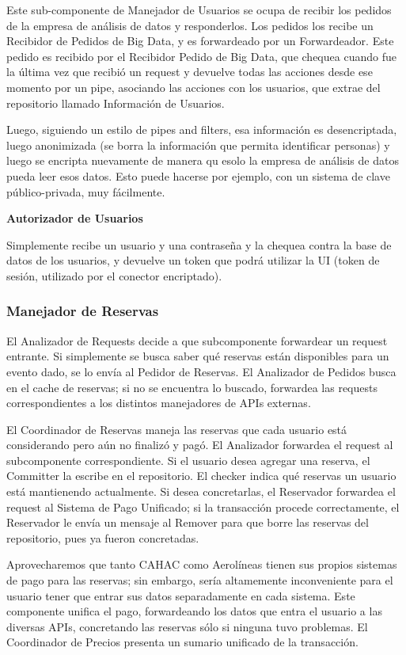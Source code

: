 Este sub-componente de Manejador de Usuarios se ocupa de recibir los pedidos de la empresa de análisis de datos y responderlos. Los pedidos los recibe un Recibidor de Pedidos de Big Data, y es forwardeado por un Forwardeador. Este pedido es recibido por el Recibidor Pedido de Big Data, que chequea cuando fue la última vez que recibió un request y devuelve todas las acciones desde ese momento por un pipe, asociando las acciones con los usuarios, que extrae del repositorio
llamado Información de Usuarios.

Luego, siguiendo un estilo de pipes and filters, esa información es desencriptada, luego anonimizada (se borra la información que permita identificar personas) y luego se encripta nuevamente de manera qu esolo la empresa de análisis de datos pueda leer esos datos. Esto puede hacerse por ejemplo, con un sistema de clave público-privada, muy fácilmente.

\textbf{Autorizador de Usuarios}

Simplemente recibe un usuario y una contraseña y la chequea contra la base de datos de los usuarios, y devuelve un token que podrá utilizar la UI (token de sesión, utilizado por el conector encriptado).

\subsubsection{Manejador de Reservas}

El Analizador de Requests decide a que subcomponente forwardear un request entrante. Si simplemente se busca saber qué reservas están disponibles para un evento dado, se lo envía al Pedidor de Reservas. El Analizador de Pedidos busca en el cache de reservas; si no se encuentra lo buscado, forwardea las requests correspondientes a los distintos manejadores de APIs externas.

El Coordinador de Reservas maneja las reservas que cada usuario está considerando pero aún no finalizó y pagó. El Analizador forwardea el request al subcomponente correspondiente. Si el usuario desea agregar una reserva, el Committer la escribe en el repositorio. El checker indica qué reservas un usuario está mantienendo actualmente. Si desea concretarlas, el Reservador forwardea el request al Sistema de Pago Unificado; si la transacción procede correctamente, el Reservador le envía un mensaje al Remover para que borre las reservas del repositorio, pues ya fueron concretadas.

Aprovecharemos que  tanto CAHAC como Aerolíneas tienen sus propios sistemas de pago para las reservas; sin embargo, sería altamemente inconveniente para el usuario tener que entrar sus datos separadamente en cada sistema. Este componente unifica el pago, forwardeando los datos que entra el usuario a las diversas APIs, concretando las reservas sólo si ninguna tuvo problemas. El Coordinador de Precios presenta un sumario unificado de la transacción.

